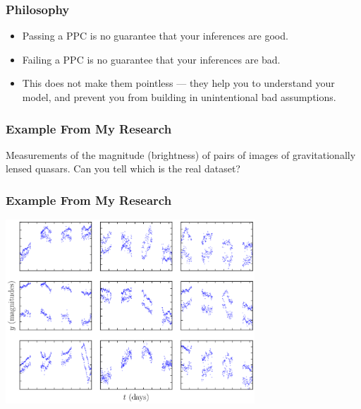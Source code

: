 \documentclass{beamer}
\begin{document}
\begin{frame}[fragile]
\frametitle{Philosophy}
\begin{itemize}
\item Passing a PPC is no guarantee that your inferences are good.\pause
\item Failing a PPC is no guarantee that your inferences are bad.\pause
\item This does not make them pointless --- they help you to understand
your model, and prevent you from building in unintentional bad assumptions.
\end{itemize}
\end{frame}

\begin{frame}[fragile]
\frametitle{Example From My Research}
Measurements of the magnitude (brightness) of pairs of images of gravitationally
lensed quasars. Can you tell which is the real dataset?

\end{frame}

\begin{frame}[fragile]
\frametitle{Example From My Research}

\begin{center}
\includegraphics[width=0.7\textwidth]{images/time_delays.png}
\end{center}

\end{frame}
\end{document}

